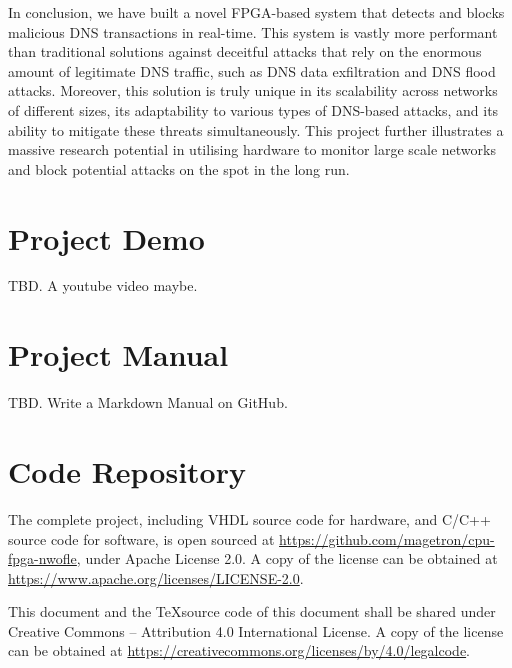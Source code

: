 \documentclass[a4paper]{report}
\newcommand{\proglang}{\textsf}
\begin{document}
In conclusion, we have built a novel FPGA-based system that detects and blocks malicious DNS transactions in real-time. This system is vastly more performant than traditional solutions against deceitful attacks that rely on the enormous amount of legitimate DNS traffic, such as DNS data exfiltration and DNS flood attacks. Moreover, this solution is truly unique in its scalability across networks of different sizes, its adaptability to various types of DNS-based attacks, and its ability to mitigate these threats simultaneously. This project further illustrates a massive research potential in utilising hardware to monitor large scale networks and block potential attacks on the spot in the long run.

\printbibliography[title=References]

\appendix

\chapter{Project Demo}

TBD. A youtube video maybe.

\chapter{Project Manual}

TBD. Write a Markdown Manual on GitHub.

\chapter{Code Repository}

The complete project, including \proglang{VHDL} source code for hardware, and \proglang{C/C++} source code for software, is open sourced at  \url{https://github.com/magetron/cpu-fpga-nwofle}, under Apache License 2.0. A copy of the license can be obtained at \url{https://www.apache.org/licenses/LICENSE-2.0}.

This document and the \TeX  source code of this document shall be shared under Creative Commons – Attribution 4.0 International License. A copy of the license can be obtained at \url{https://creativecommons.org/licenses/by/4.0/legalcode}.


\end{document}
